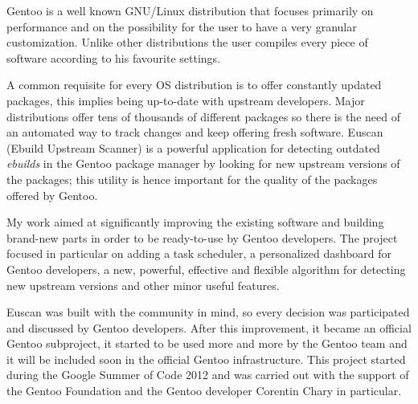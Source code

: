
Gentoo is a well known GNU/Linux distribution that focuses primarily on performance and on the possibility for the user to have a very granular customization. Unlike other distributions the user compiles every piece of software according to his favourite settings.

A common requisite for every OS distribution is to offer constantly updated packages, this implies being up-to-date with upstream developers. Major distributions offer tens of thousands of different packages so there is the need of an automated way to track changes and keep offering fresh software.
Euscan (Ebuild Upstream Scanner) is a powerful application for detecting outdated \emph{ebuilds} in the Gentoo package manager by looking for new upstream versions of the packages; this utility is hence important for the quality of the packages offered by Gentoo.

My work aimed at significantly improving the existing software and building brand-new parts in order to be ready-to-use by Gentoo developers. The project focused in particular on adding a task scheduler, a personalized dashboard for Gentoo developers, a new, powerful, effective and flexible algorithm for detecting new upstream versions and other minor useful features.

Euscan was built with the community in mind, so every decision was participated and discussed by Gentoo developers. After this improvement, it became an official Gentoo subproject, it started to be used more and more by the Gentoo team and it will be included soon in the official Gentoo infrastructure.
This project started during the Google Summer of Code 2012 and was carried out with the support of the Gentoo Foundation and the Gentoo developer Corentin Chary in particular.
